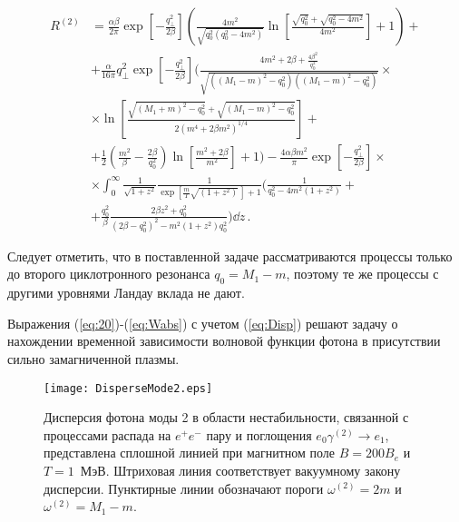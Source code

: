 \begin{equation}\begin{aligned}
	R^{(2)}&= \frac{\alpha\beta}{2\pi}\exp\left[-\frac{q_\perp^2}{2\beta}\right]\left(\frac{4m^2}{\sqrt{q_0^2(q_0^2-4m^2)}}\ln\left[\frac{\sqrt{q_0^2}+\sqrt{q_0^2-4m^2}}{4m^2}\right]+1\right)+ 
	\\
	&+\frac{\alpha}{16\pi}q^2_\perp \exp\left[-\frac{q_\perp^2}{2\beta}\right] \bigg( \frac{4m^2+2\beta+\frac{4\beta^2}{ q_0^2}}{\sqrt{((M_1-m)^2-q^2_0)((M_1-m)^2-q^2_0)}}
	\times
	\\
	&\times
	\ln\left[\frac{\sqrt{(M_1+m)^2-q_0^2}+\sqrt{(M_1-m)^2-q_0^2}}{2(m^4+2\beta m^2)^{1/4}}\right]+
	\\
	&+\frac{1}{2}\left(\frac{m^2}{\beta}-\frac{2\beta}{q_0^2}\right)\ln\left[\frac{m^2+2\beta}{m^2}\right]+1\bigg)- \frac{4\alpha\beta m^2}{\pi}\exp\left[-\frac{q_\perp^2}{2\beta}\right]\times
	\\
	&\times
	\int_{0}^{\infty}\frac{1}{\sqrt{1+z^2}}\frac{1}{\exp[\frac{m}{T}\sqrt{(1+z^2)}\,]+1}\bigg(\frac{1}{q_0^2-4m^2(1+z^2)}+
	\\
	&+\frac{q_0^2}{\beta}\frac{2\beta z^2 + q_0^2}{(2\beta - q_0^2)^2-m^2(1+z^2)q_0^2}\bigg)\dd z\, .
\end{aligned}\end{equation}

Следует отметить, что в поставленной задаче рассматриваются процессы только до второго циклотронного резонанса $q_0=M_1-m$, поэтому те же процессы с другими уровнями Ландау вклада не дают.

Выражения (\ref{eq:20})-(\ref{eq:Wabs}) с учетом (\ref{eq:Disp}) решают задачу 
о нахождении временной зависимости волновой функции фотона  в присутствии сильно 
замагниченной плазмы. 

\begin{figure}[t!]\centering
	\texttt{[image: DisperseMode2.eps]}
	\caption{Дисперсия фотона моды 2 в области нестабильности, связанной с процессами распада на $e^+e^-$ пару и поглощения $e_0 \gamma^{(2)}\to e_1$, представлена сплошной линией при магнитном поле $B=200B_e$ и $T=1$~МэВ. Штриховая линия соответствует вакуумному закону дисперсии. Пунктирные линии обозначают пороги $\omega^{(2)}=2m$ и $\omega^{(2)}=M_1-m$. \label{fig:DisperseMode2}}
\end{figure}

